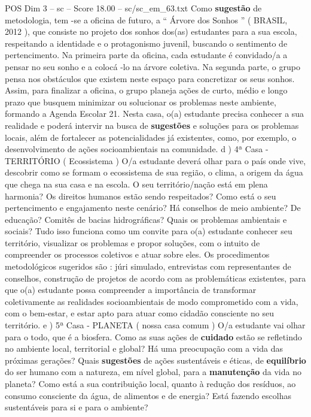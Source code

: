 \begin{textsample}{POS Dim 3 – sc – Score 18.00 – sc/sc\_em\_63.txt}
Como \textbf{sugestão} de metodologia, tem -se a oficina de futuro, a “ Árvore dos Sonhos ” ( BRASIL, 2012 ), que consiste no projeto dos sonhos dos(as) estudantes para a sua escola, respeitando a identidade e o protagonismo juvenil, buscando o sentimento de pertencimento.
Na primeira parte da oficina, cada estudante é convidado/a a pensar no seu sonho e a colocá -lo na árvore coletiva.
Na segunda parte, o grupo pensa nos obstáculos que existem neste espaço para concretizar os seus sonhos.
Assim, para finalizar a oficina, o grupo planeja ações de curto, médio e longo prazo que busquem minimizar ou solucionar os problemas neste ambiente, formando a Agenda Escolar 21.
Nesta casa, o(a) estudante precisa conhecer a sua realidade e poderá intervir na busca de \textbf{sugestões} e soluções para os problemas locais, além de fortalecer as potencialidades já existentes, como, por exemplo, o desenvolvimento de ações socioambientais na comunidade. d ) 4ª Casa - TERRITÓRIO ( Ecossistema ) O/a estudante deverá olhar para o país onde vive, descobrir como se formam o ecossistema de sua região, o clima, a origem da água que chega na sua casa e na escola.
O seu território/nação está em plena harmonia?
Os direitos humanos estão sendo respeitados?
Como está o seu pertencimento e engajamento neste cenário?
Há conselhos de meio ambiente?
De educação?
Comitês de bacias hidrográficas?
Quais os problemas ambientais e sociais?
Tudo isso funciona como um convite para o(a) estudante conhecer seu território, visualizar os problemas e propor soluções, com o intuito de compreender os processos coletivos e atuar sobre eles.
Os procedimentos metodológicos sugeridos são : júri simulado, entrevistas com representantes de conselhos, construção de projetos de acordo com as problemáticas existentes, para que o(a) estudante possa compreender a importância de transformar coletivamente as realidades socioambientais de modo comprometido com a vida, com o bem-estar, e estar apto para atuar como cidadão consciente no seu território. e ) 5ª Casa - PLANETA ( nossa casa comum ) O/a estudante vai olhar para o todo, que é a biosfera.
Como as suas ações de \textbf{cuidado} estão se refletindo no ambiente local, territorial e global?
Há uma preocupação com a vida das próximas gerações?
Quais \textbf{sugestões} de ações sustentáveis e éticas, de \textbf{equilíbrio} do ser humano com a natureza, em nível global, para a \textbf{manutenção} da vida no planeta?
Como está a sua contribuição local, quanto à redução dos resíduos, ao consumo consciente da água, de alimentos e de energia?
Está fazendo escolhas sustentáveis para si e para o ambiente?

\end{textsample}
